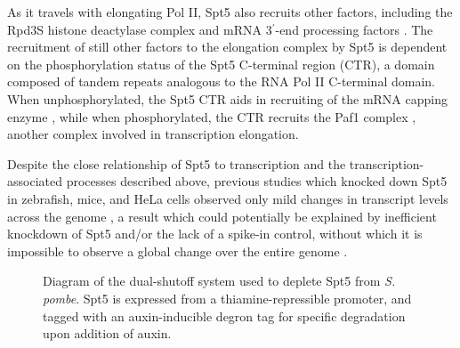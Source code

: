 As it travels with elongating Pol II, Spt5 also recruits other factors, including the Rpd3S histone deactylase complex \citep{drouin2010} and mRNA 3$^\prime$-end processing factors \citep{mayer2012, stadelmayer2014, yamamoto2014}.
The recruitment of still other factors to the elongation complex by Spt5 is dependent on the phosphorylation status of the Spt5 C-terminal region (CTR), a domain composed of tandem repeats analogous to the RNA Pol II C-terminal domain.
When unphosphorylated, the Spt5 CTR aids in recruiting of the mRNA capping enzyme \citep{doamekpor2014, doamekpor2015, schneider2010, wen1999}, while when phosphorylated, the CTR recruits the Paf1 complex \citep{liu2009, mbogning2013, wier2013, zhou2009}, another complex involved in transcription elongation.

Despite the close relationship of Spt5 to transcription and the transcription-associated processes described above, previous studies which knocked down Spt5 in zebrafish, mice, and HeLa cells observed only mild changes in transcript levels across the genome \citep{diamant2016b, komori2009, krishnan2008, stanlie2012}, a result which could potentially be explained by inefficient knockdown of Spt5 and/or the lack of a spike-in control, without which it is impossible to observe a global change over the entire genome \citep{chen2016}.

\begin{wrapfigure}[11]{r}{3in}
    \caption[Diagram of the dual-shutoff system used to deplete Spt5 from \textit{S. pombe}]{Diagram of the dual-shutoff system used to deplete Spt5 from \textit{S. pombe}. Spt5 is expressed from a thiamine-repressible promoter, and tagged with an auxin-inducible degron tag for specific degradation upon addition of auxin.}
    \label{fig:five_depletion_diagram}
\end{wrapfigure}

